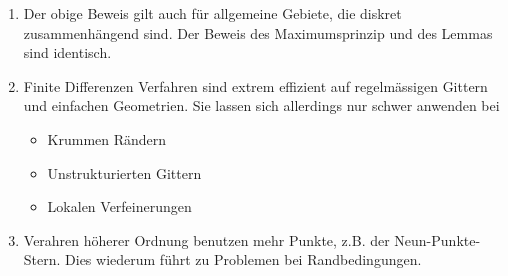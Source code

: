 \begin{bem}
\begin{enumerate}
\item Der obige Beweis gilt auch für allgemeine Gebiete, die diskret zusammenhängend sind. Der Beweis
des Maximumsprinzip und des Lemmas sind identisch.
\item Finite Differenzen Verfahren sind extrem effizient auf regelmässigen Gittern und einfachen 
Geometrien. Sie lassen sich allerdings nur schwer anwenden bei
\begin{itemize}
\item Krummen Rändern
\item Unstrukturierten Gittern
\item Lokalen Verfeinerungen
\end{itemize}
\item Verahren höherer Ordnung benutzen mehr Punkte, z.B. der Neun-Punkte-Stern. Dies wiederum führt zu
Problemen bei Randbedingungen.
\end{enumerate}
\end{bem}




